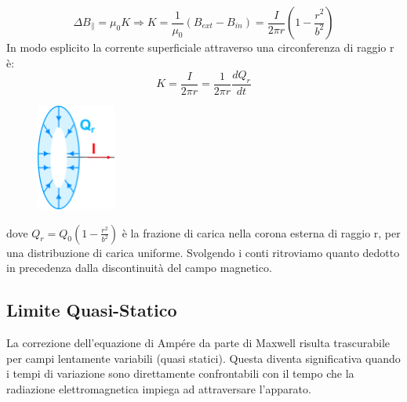 \begin{equation*}
	\Delta B_{\parallel} = \mu_0 K \Rightarrow K = \frac{1}{\mu_0}(B_{ext} - B_{in}) = \frac{I}{2\pi r}\left(1 - \frac{r^2}{b^2}\right)
\end{equation*}
In modo esplicito la corrente superficiale attraverso una circonferenza di raggio r \`e: 
\begin{equation*}
	K = \frac{I}{2 \pi r} = \frac{1}{2\pi r}\frac{dQ_r}{dt}
\end{equation*}
 \begin{figure}
 \vspace{-1.5cm}  %
    \centering
    \includegraphics[width=0.23\textwidth]{images/parallel_plate2} %
\end{figure}
dove $Q_r = Q_0\left(1-\frac{r^2}{b^2}\right)$ \`e la frazione di carica nella corona esterna di raggio r, per una distribuzione di carica uniforme. Svolgendo i conti ritroviamo quanto dedotto in precedenza dalla discontinuit\`a del campo magnetico.

\subsection{Limite Quasi-Statico}

La correzione dell'equazione di Amp\'ere da parte di Maxwell risulta trascurabile per campi lentamente variabili (quasi statici). Questa diventa significativa quando i tempi di variazione sono direttamente confrontabili con il tempo che la radiazione elettromagnetica impiega ad attraversare l'apparato. 


